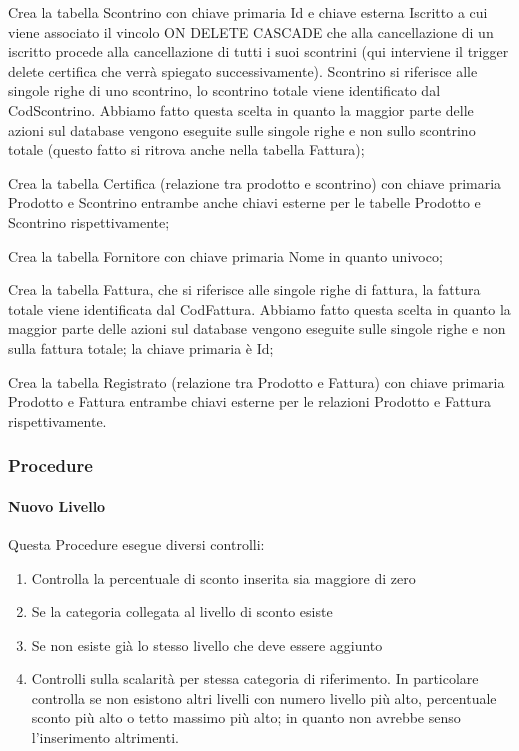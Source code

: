 
Crea la tabella Scontrino con chiave primaria Id e chiave esterna Iscritto a cui viene associato il vincolo ON DELETE CASCADE che alla cancellazione di un iscritto procede alla cancellazione di tutti i suoi scontrini (qui interviene il trigger delete certifica che verr\`a spiegato successivamente). Scontrino si riferisce alle singole righe di uno scontrino, lo scontrino totale viene identificato dal CodScontrino. Abbiamo fatto questa scelta in quanto la maggior parte delle azioni sul database vengono eseguite sulle singole righe e non sullo scontrino totale (questo fatto si ritrova anche nella tabella Fattura);


Crea la tabella Certifica (relazione tra prodotto e scontrino) con chiave primaria Prodotto e Scontrino entrambe anche chiavi esterne per le tabelle Prodotto e Scontrino rispettivamente;


Crea la tabella Fornitore con chiave primaria Nome in quanto univoco;


Crea la tabella Fattura, che si riferisce alle singole righe di fattura, la fattura totale viene identificata dal CodFattura. Abbiamo fatto questa scelta in quanto la maggior parte delle azioni sul database vengono eseguite sulle singole righe e non sulla fattura totale; la chiave primaria \`e Id;


Crea la tabella Registrato (relazione tra Prodotto e Fattura) con chiave primaria Prodotto e Fattura entrambe chiavi esterne per le relazioni Prodotto e Fattura rispettivamente.


\subsubsection{Procedure}

\paragraph*{Nuovo Livello}
Questa Procedure esegue diversi controlli:
\begin{enumerate}

\item Controlla la percentuale di sconto inserita sia maggiore di zero

\item Se la categoria collegata al livello di sconto esiste

\item Se non esiste gi\`a lo stesso livello che deve essere aggiunto

\item Controlli sulla scalarit\`a per stessa categoria di riferimento. In particolare controlla se non esistono altri livelli con numero livello pi\`u alto, percentuale sconto pi\`u alto o tetto massimo pi\`u alto; in quanto non avrebbe senso l'inserimento altrimenti.
\end{enumerate}

